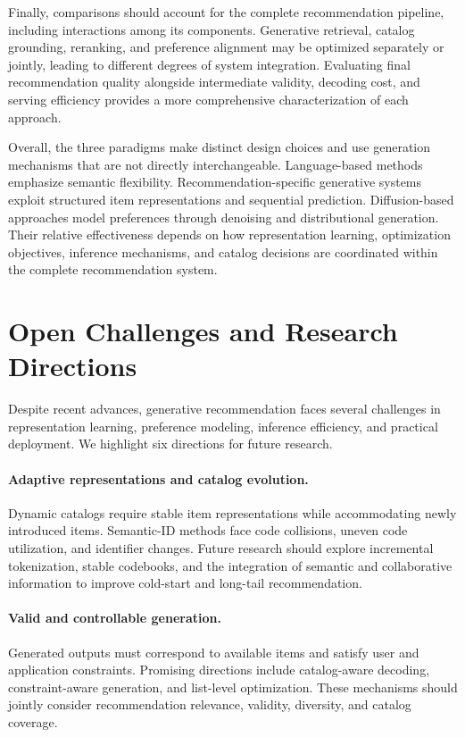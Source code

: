 \documentclass[sigconf,nonacm]{acmart}
\begin{document}
Finally, comparisons should account for the
complete recommendation pipeline, including
interactions among its components. Generative retrieval,
catalog grounding, reranking, and preference
alignment may be optimized separately or
jointly, leading to different degrees of
system integration. Evaluating final recommendation
quality alongside intermediate validity,
decoding cost, and serving efficiency provides
a more comprehensive characterization of
each approach.

Overall, the three paradigms make distinct
design choices and use generation mechanisms
that are not directly interchangeable. Language-based methods
emphasize semantic flexibility. Recom\-men\-dation-specific
generative systems exploit structured
item representations and sequential prediction.
Diffusion-based approaches model preferences
through denoising and distributional generation.
Their relative effectiveness depends on how
representation learning, optimization objectives,
inference mechanisms, and catalog decisions
are coordinated within the complete
recommendation system.




\section{Open Challenges and Research Directions}
\label{sec:challenges}

Despite recent advances, generative recommendation faces
several challenges in representation learning, preference
modeling, inference efficiency, and practical deployment.
We highlight six directions for future research.

\paragraph{Adaptive representations and catalog evolution.}
Dynamic catalogs require stable item representations while
accommodating newly introduced items. Semantic-ID methods
face code collisions, uneven code utilization, and
identifier changes. Future research should explore
incremental tokenization, stable codebooks, and the
integration of semantic and collaborative information
to improve cold-start and long-tail recommendation.

\paragraph{Valid and controllable generation.}
Generated outputs must correspond to available items
and satisfy user and application constraints.
Promising directions include catalog-aware decoding,
constraint-aware generation, and list-level optimization.
These mechanisms should jointly consider recommendation
relevance, validity, diversity, and catalog coverage.
\end{document}
